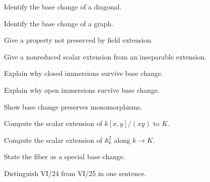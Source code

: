 \begin{exercise}\label{exr:vi24-16}
Identify the base change of a diagonal.
\end{exercise}
\begin{exercise}\label{exr:vi24-17}
Identify the base change of a graph.
\end{exercise}
\begin{exercise}\label{exr:vi24-18}
Give a property not preserved by field extension.
\end{exercise}
\begin{exercise}\label{exr:vi24-19}
Give a nonreduced scalar extension from an inseparable extension.
\end{exercise}
\begin{exercise}\label{exr:vi24-20}
Explain why closed immersions survive base change.
\end{exercise}
\begin{exercise}\label{exr:vi24-21}
Explain why open immersions survive base change.
\end{exercise}
\begin{exercise}\label{exr:vi24-22}
Show base change preserves monomorphisms.
\end{exercise}
\begin{exercise}\label{exr:vi24-23}
Compute the scalar extension of $k[x,y]/(xy)$ to $K$.
\end{exercise}
\begin{exercise}\label{exr:vi24-24}
Compute the scalar extension of $\mathbb A^2_k$ along $k\to K$.
\end{exercise}
\begin{exercise}\label{exr:vi24-25}
State the fiber as a special base change.
\end{exercise}
\begin{exercise}\label{exr:vi24-26}
Distinguish VI/24 from VI/25 in one sentence.
\end{exercise}